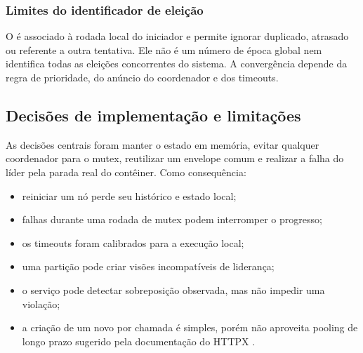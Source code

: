 \subsubsection{Limites do identificador de eleição}

O  é associado à rodada local do iniciador e permite ignorar  duplicado, atrasado ou referente a outra tentativa. Ele não é um número de época global nem identifica todas as eleições concorrentes do sistema. A convergência depende da regra de prioridade, do anúncio do coordenador e dos timeouts.

\subsection{Decisões de implementação e limitações}

As decisões centrais foram manter o estado em memória, evitar qualquer coordenador para o mutex, reutilizar um envelope comum e realizar a falha do líder pela parada real do contêiner. Como consequência:

\begin{itemize}
    \item reiniciar um nó perde seu histórico e estado local;
    \item falhas durante uma rodada de mutex podem interromper o progresso;
    \item os timeouts foram calibrados para a execução local;
    \item uma partição pode criar visões incompatíveis de liderança;
    \item o serviço  pode detectar sobreposição observada, mas não impedir uma violação;
    \item a criação de um novo  por chamada é simples, porém não aproveita pooling de longo prazo sugerido pela documentação do HTTPX \cite{httpx}.
\end{itemize}
